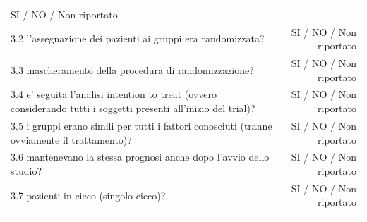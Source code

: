 \documentclass[]{book}
\begin{document}
\begin{longtable}[]{@{}lr@{}}
\begin{minipage}[t]{0.47\columnwidth}
SI / NO / Non riportato\strut
\end{minipage}\tabularnewline
\begin{minipage}[t]{0.47\columnwidth}\raggedright
3.2 l'assegnazione dei pazienti ai gruppi era randomizzata?\strut
\end{minipage} & \begin{minipage}[t]{0.47\columnwidth}\raggedleft
SI / NO / Non riportato\strut
\end{minipage}\tabularnewline
\begin{minipage}[t]{0.47\columnwidth}\raggedright
3.3 mascheramento della procedura di randomizzazione?\strut
\end{minipage} & \begin{minipage}[t]{0.47\columnwidth}\raggedleft
SI / NO / Non riportato\strut
\end{minipage}\tabularnewline
\begin{minipage}[t]{0.47\columnwidth}\raggedright
3.4 e' seguita l'analisi intention to treat (ovvero considerando tutti i soggetti presenti all'inizio del trial)?\strut
\end{minipage} & \begin{minipage}[t]{0.47\columnwidth}\raggedleft
SI / NO / Non riportato\strut
\end{minipage}\tabularnewline
\begin{minipage}[t]{0.47\columnwidth}\raggedright
3.5 i gruppi erano simili per tutti i fattori conosciuti (tranne ovviamente il trattamento)?\strut
\end{minipage} & \begin{minipage}[t]{0.47\columnwidth}\raggedleft
SI / NO / Non riportato\strut
\end{minipage}\tabularnewline
\begin{minipage}[t]{0.47\columnwidth}\raggedright
3.6 mantenevano la stessa prognosi anche dopo l'avvio dello studio?\strut
\end{minipage} & \begin{minipage}[t]{0.47\columnwidth}\raggedleft
SI / NO / Non riportato\strut
\end{minipage}\tabularnewline
\begin{minipage}[t]{0.47\columnwidth}\raggedright
3.7 pazienti in cieco (singolo cieco)?\strut
\end{minipage} & \begin{minipage}[t]{0.47\columnwidth}\raggedleft
SI / NO / Non riportato\strut
\end{minipage}\tabularnewline
\begin{minipage}[t]{0.47\columnwidth}\raggedright

\end{minipage}
\end{longtable}
\end{document}
